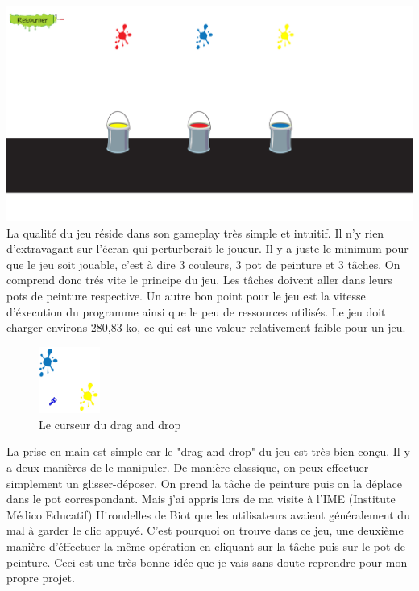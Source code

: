 \documentclass{article}
\begin{document}
\vspace{0.5cm}
\includegraphics[width=\textwidth]{4}\\
\hspace*{0.6cm}La qualit\'e du jeu r\'eside dans son gameplay tr\`es simple et intuitif. Il n'y rien d'extravagant sur l'\'ecran qui perturberait le joueur. Il y a juste le minimum pour que le jeu soit jouable, c'est \`a dire 3 couleurs, 3 pot de peinture et 3 t\^aches. On comprend donc tr\'es vite le principe du jeu. Les t\^aches doivent aller dans leurs pots de peinture respective. Un autre bon point pour le jeu est la vitesse d'\'execution du programme ainsi que le peu de ressources utilis\'es. Le jeu doit charger environs 280,83 ko, ce qui est une valeur relativement faible pour un jeu.\\

\begin{figure}
  \vspace{-20pt}
  \begin{center}
    \includegraphics[width=0.18\textwidth]{10}
  \end{center}
  \vspace{-20pt}
  \caption{Le curseur du drag and drop}
  \vspace{-10pt}
\end{figure}

\hspace*{0.6cm}La prise en main est simple car le "drag and drop" du jeu est tr\`es bien con\c{c}u. Il y a deux mani\`eres de le manipuler. De mani\`ere classique, on peux effectuer simplement un glisser-d\'eposer. On prend la t\^ache de peinture puis on la d\'eplace dans le pot correspondant. Mais j'ai appris lors de ma visite \`a l'IME (Institute M\'edico Educatif) Hirondelles de Biot que les utilisateurs avaient g\'en\'eralement du mal \`a garder le clic appuy\'e. C'est pourquoi on trouve dans ce jeu, une deuxi\`eme mani\`ere d'\'effectuer la m\^eme op\'eration en cliquant sur la t\^ache puis sur le pot de peinture. Ceci est une tr\`es bonne id\'ee que je vais sans doute reprendre pour mon propre projet.\\
\end{document}
